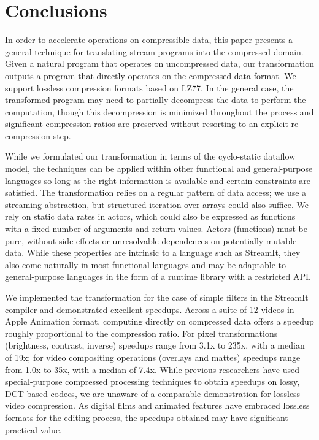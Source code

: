 \section{Conclusions}
\label{sec:conclusions}


In order to accelerate operations on compressible data, this paper
presents a general technique for translating stream programs into the
compressed domain.  Given a natural program that operates on
uncompressed data, our transformation outputs a program that directly
operates on the compressed data format.  We support lossless
compression formats based on LZ77.  In the general case, the
transformed program may need to partially decompress the data to
perform the computation, though this decompression is minimized
throughout the process and significant compression ratios are
preserved without resorting to an explicit re-compression step.

While we formulated our transformation in terms of the cyclo-static
dataflow model, the techniques can be applied within other functional
and general-purpose languages so long as the right information is
available and certain constraints are satisfied.  The transformation
relies on a regular pattern of data access; we use a streaming
abstraction, but structured iteration over arrays could also suffice.
We rely on static data rates in actors, which could also be expressed
as functions with a fixed number of arguments and return values.
Actors (functions) must be pure, without side effects or unresolvable
dependences on potentially mutable data.  While these properties are
intrinsic to a language such as StreamIt, they also come naturally in
most functional languages and may be adaptable to general-purpose
languages in the form of a runtime library with a restricted API.

We implemented the transformation for the case of simple filters in
the StreamIt compiler and demonstrated excellent speedups.  Across a
suite of 12 videos in Apple Animation format, computing directly on
compressed data offers a speedup roughly proportional to the
compression ratio.  For pixel transformations (brightness, contrast,
inverse) speedups range from 3.1x to 235x, with a median of 19x; for
video compositing operations (overlays and mattes) speedups range from
1.0x to 35x, with a median of 7.4x.  While previous researchers have
used special-purpose compressed processing techniques to obtain
speedups on lossy, DCT-based codecs, we are unaware of a comparable
demonstration for lossless video compression.  As digital films and
animated features have embraced lossless formats for the editing
process, the speedups obtained may have significant practical value.
